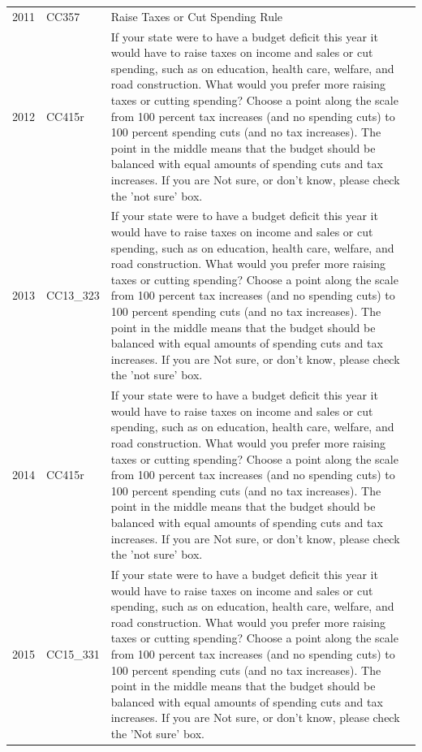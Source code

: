 \documentclass[12pt]{article}
\begin{document}
\begin{longtable}[t]{rl>{\raggedright\arraybackslash}p{10cm}}
2011 & CC357 & Raise Taxes or Cut Spending Rule\\
2012 & CC415r & If your state were to have a budget deficit this year it would have to raise taxes on income and sales or cut spending, such as on education, health care, welfare, and road construction. What would you prefer more raising taxes or cutting spending? Choose a point along the scale from 100 percent tax increases (and no spending cuts) to 100 percent spending cuts (and no tax increases). The point in the middle means that the budget should be balanced with equal amounts of spending cuts and tax increases. If you are Not sure, or don't know, please check the 'not sure' box.\\
2013 & CC13\_323 & If your state were to have a budget deficit this year it would have to raise taxes on income and sales or cut spending, such as on education, health care, welfare, and road construction. What would you prefer more raising taxes or cutting spending? Choose a point along the scale from 100 percent tax increases (and no spending cuts) to 100 percent spending cuts (and no tax increases). The point in the middle means that the budget should be balanced with equal amounts of spending cuts and tax increases. If you are Not sure, or don't know, please check the 'not sure' box.\\
2014 & CC415r & If your state were to have a budget deficit this year it would have to raise taxes on income and sales or cut spending, such as on education, health care, welfare, and road construction. What would you prefer more raising taxes or cutting spending? Choose a point along the scale from 100 percent tax increases (and no spending cuts) to 100 percent spending cuts (and no tax increases). The point in the middle means that the budget should be balanced with equal amounts of spending cuts and tax increases. If you are Not sure, or don't know, please check the 'not sure' box.\\
2015 & CC15\_331 & If your state were to have a budget deficit this year it would have to raise taxes on income and sales or cut spending, such as on education, health care, welfare, and road construction. What would you prefer more raising taxes or cutting spending? Choose a point along the scale from 100 percent tax increases (and no spending cuts) to 100 percent spending cuts (and no tax increases). The point in the middle means that the budget should be balanced with equal amounts of spending cuts and tax increases. If you are Not sure, or don't know, please check the 'Not sure' box.\\

\end{longtable}
\end{document}
